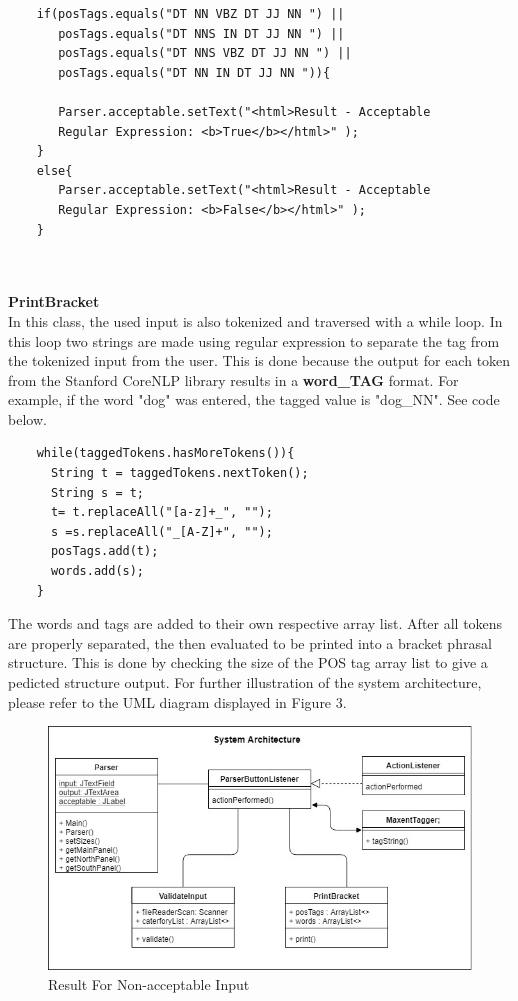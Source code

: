 \begin{lstlisting}
	if(posTags.equals("DT NN VBZ DT JJ NN ") ||
	   posTags.equals("DT NNS IN DT JJ NN ") ||
	   posTags.equals("DT NNS VBZ DT JJ NN ") ||
	   posTags.equals("DT NN IN DT JJ NN ")){
		
	   Parser.acceptable.setText("<html>Result - Acceptable 
	   Regular Expression: <b>True</b></html>" );
	}
	else{
	   Parser.acceptable.setText("<html>Result - Acceptable 
	   Regular Expression: <b>False</b></html>" );
	}
\end{lstlisting}\\ \\ 
\textbf{PrintBracket}\\
In this class, the used input is also tokenized and traversed with a while loop. In this loop two strings are made using regular expression to separate the tag from the tokenized input from the user. This is done because the output for each token from the Stanford CoreNLP library results in a \textbf{word\_TAG} format. For example, if the word "dog" was entered, the tagged value is "dog\_NN".  See code below.
\begin{lstlisting}
	while(taggedTokens.hasMoreTokens()){
 	  String t = taggedTokens.nextToken();
	  String s = t;
	  t= t.replaceAll("[a-z]+_", "");
	  s =s.replaceAll("_[A-Z]+", "");
	  posTags.add(t);
	  words.add(s);
	}
\end{lstlisting}
The words and tags are added to their own respective array list. After all tokens are properly separated, the then evaluated to be printed into a bracket phrasal structure. This is done by checking the size of the POS tag array list to give a pedicted structure output. For further illustration of the system architecture, please refer to the UML diagram displayed in Figure 3.
\begin{figure}[ht]
	\begin{center}
		\advance\leftskip-3cm
		\advance\rightskip-3cm
		\includegraphics[keepaspectratio=true,scale=0.5]{__resources/uml.jpg}
		\caption{Result For Non-acceptable Input}
		\label{onset}
	\end{center}
\end{figure}

